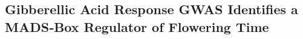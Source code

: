 \documentclass[10pt,letterpaper]{article}
\begin{document}


\subsection*{Gibberellic Acid Response GWAS Identifies a MADS‑Box Regulator of Flowering Time}
\end{document}
